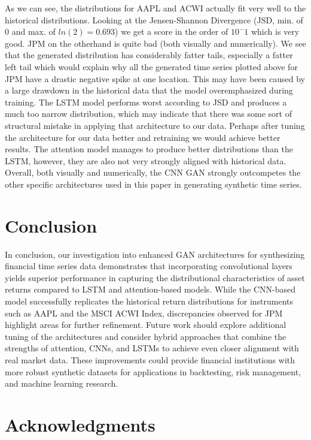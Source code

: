 \documentclass{article}
\begin{document}
As we can see, the distributions for AAPL and ACWI actually fit very well to the historical distributions. Looking at the Jensen-Shannon Divergence (JSD, min. of 0 and max. of $ ln(2) = 0.693 $) we get a score in the order of $ 10^-1 $ which is very good. JPM on the otherhand is quite bad (both visually and numerically). We see that the generated distribution has considerably fatter tails, especially a fatter left tail which would explain why all the generated time series plotted above for JPM have a drastic negative spike at one location. This may have been caused by a large drawdown in the historical data that the model overemphasized during training. The LSTM model performs worst according to JSD and produces a much too narrow distribution, which may indicate that there was some sort of structural mistake in applying that architecture to our data. Perhaps after tuning the architecture for our data better and retraining we would achieve better results. The attention model manages to produce better distributions than the LSTM, however, they are also not very strongly aligned with historical data. Overall, both visually and numerically, the CNN GAN strongly outcompetes the other specific architectures used in this paper in generating synthetic time series.

\section{Conclusion}

In conclusion, our investigation into enhanced GAN architectures for synthesizing financial time series data demonstrates that incorporating convolutional layers yields superior performance in capturing the distributional characteristics of asset returns compared to LSTM and attention-based models. While the CNN-based model successfully replicates the historical return distributions for instruments such as AAPL and the MSCI ACWI Index, discrepancies observed for JPM highlight areas for further refinement. Future work should explore additional tuning of the architectures and consider hybrid approaches that combine the strengths of attention, CNNs, and LSTMs to achieve even closer alignment with real market data. These improvements could provide financial institutions with more robust synthetic datasets for applications in backtesting, risk management, and machine learning research.

\section*{Acknowledgments}
\end{document}
